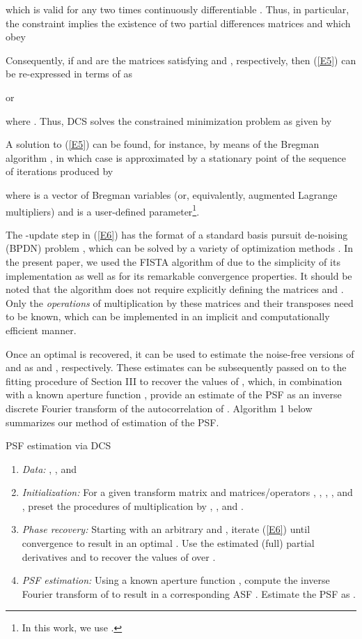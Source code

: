 \pdfoutput=1 \documentclass[journal]{IEEEtran}
\begin{document}
which is valid for any two times continuously differentiable . Thus, in particular, the constraint implies the existence of two partial differences matrices  and  which obey

Consequently, if  and  are the matrices satisfying  and , respectively, then (\ref{E5}) can be re-expressed in terms of  as

or

where . Thus, DCS solves the constrained minimization problem as given by


A solution to (\ref{E5}) can be found, for instance, by means of the Bregman algorithm \cite{22}, in which case  is approximated by a stationary point of the sequence of iterations produced by

where  is a vector of Bregman variables (or, equivalently, augmented Lagrange multipliers) and  is a user-defined parameter\footnote{In this work, we use .}.

The -update step in (\ref{E6}) has the format of a standard basis pursuit de-noising (BPDN) problem \cite{46}, which can be solved by a variety of optimization methods \cite{23}. In the present paper, we used the FISTA algorithm of \cite{33} due to the simplicity of its implementation as well as for its remarkable convergence properties. It should be noted that the algorithm does not require explicitly defining the matrices  and . Only the {\em operations} of multiplication by these matrices and their transposes need to be known, which can be implemented in an implicit and computationally efficient manner.

Once an optimal  is recovered, it can be used to estimate the noise-free versions of  and  as  and , respectively. These estimates can be subsequently passed on to the fitting procedure of Section III to recover the values of , which, in combination with a known aperture function , provide an estimate of the PSF  as an inverse discrete Fourier transform of the autocorrelation of . Algorithm 1 below summarizes our method of estimation of the PSF.

\begin{algorithm}
\setlength{\leftmargini}{0pt}
\caption{PSF estimation via DCS}
\begin{enumerate}
\item {\it Data:} , , and 
\item {\it Initialization:} For a given transform matrix  and matrices/operators , , , ,  and , preset the procedures of multiplication by , ,  and .
\item {\it Phase recovery:} Starting with an arbitrary  and , iterate (\ref{E6}) until convergence to result in an optimal . Use the estimated (full) partial derivatives  and  to recover the values of  over .
\item {\it PSF estimation:} Using a known aperture function , compute the inverse Fourier transform of  to result in a corresponding ASF . Estimate the PSF  as .
\end{enumerate}
\label{algo1}
\end{algorithm}
\end{document}

